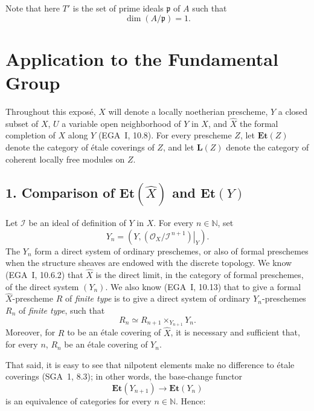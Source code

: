 \documentclass[11pt,a4paper,oneside]{book}
\providecommand{\Et}{\mathbf{Et}}
\providecommand{\LLcat}{\mathbf L}
\theoremstyle{plain}
\theoremstyle{definition}
\theoremstyle{remark}
\begin{document}
\medskip
\noindent Note that here $T'$ is the set of prime ideals $\mathfrak p$ of
$A$ such that
\[
  \dim(A/\mathfrak p)=1.
\]


\makeatletter
\providecommand{\sgareaderlabel}[2]{%
  \begingroup
  \def\@currentlabel{#2}%
  \phantomsection\label{#1}%
  \endgroup}
\makeatother

\chapter{Application to the Fundamental Group}
\label{X}

\medskip
Throughout this expos\'e, $X$ will denote a locally noetherian prescheme,
$Y$ a closed subset of $X$, $U$ a variable open neighborhood of $Y$ in $X$,
and $\widehat X$ the formal completion of $X$ along $Y$
(\textup{EGA}~I, 10.8). For every prescheme $Z$, let $\Et(Z)$ denote the
category of \'etale coverings of $Z$, and let $\LLcat(Z)$\sgareaderlabel{pX.1}{1} denote the category
of coherent locally free modules on $Z$.

\section*{1. Comparison of $\Et(\widehat X)$ and $\Et(Y)$}
\sgareaderlabel{X.1}{1}

Let $\mathcal I$ be an ideal of definition of $Y$ in $X$. For every
$n\in\mathbb N$, set
\[
  Y_n=\left(Y,\left.(\mathcal O_X/\mathcal I^{\,n+1})\right|_Y\right).
\]
The $Y_n$ form a direct system of ordinary preschemes, or also of formal
preschemes when the structure sheaves are endowed with the discrete topology.
We know (EGA~I, 10.6.2) that $\widehat X$ is the direct limit, in the category
of formal preschemes, of the direct system $(Y_n)$. We also know (EGA~I,
10.13) that to give a formal $\widehat X$-prescheme $R$ of \emph{finite type}
is to give a direct system of ordinary $Y_n$-preschemes $R_n$ of
\emph{finite type}, such that
\[
  R_n\simeq R_{n+1}\times_{Y_{n+1}}Y_n.
\]
Moreover, for $R$ to be an étale covering of $\widehat X$, it is necessary
and sufficient that, for every $n$, $R_n$ be an étale covering of $Y_n$.

That said, it is easy to see that nilpotent elements make no difference to
étale coverings (SGA~1, 8.3); in other words, the base-change functor
\[
  \Et(Y_{n+1})\longrightarrow\Et(Y_n)
\]
is an equivalence of categories for every $n\in\mathbb N$. Hence:
\end{document}
